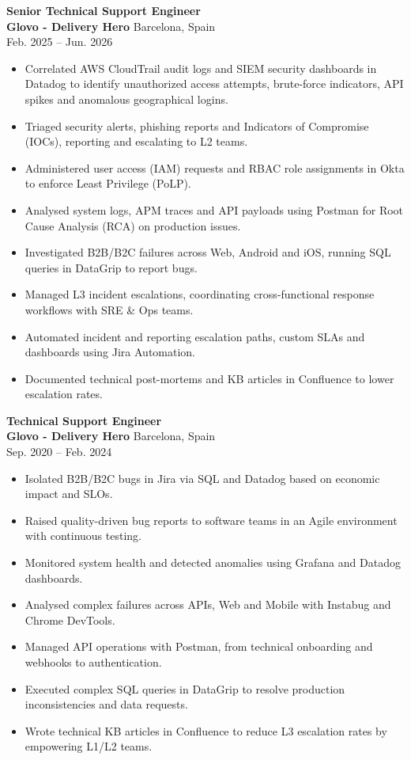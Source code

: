 \documentclass[10pt,a4paper]{article}
\begin{document}
\textbf{Senior Technical Support Engineer}\\
\textbf{Glovo - Delivery Hero} \hfill Barcelona, Spain\\
Feb. 2025 -- Jun. 2026

\begin{itemize}
\item Correlated AWS CloudTrail audit logs and SIEM security dashboards in Datadog to identify unauthorized access attempts, brute-force indicators, API spikes and anomalous geographical logins.
\item Triaged security alerts, phishing reports and Indicators of Compromise (IOCs), reporting and escalating to L2 teams.
\item Administered user access (IAM) requests and RBAC role assignments in Okta to enforce Least Privilege (PoLP).
\item Analysed system logs, APM traces and API payloads using Postman for Root Cause Analysis (RCA) on production issues.
\item Investigated B2B/B2C failures across Web, Android and iOS, running SQL queries in DataGrip to report bugs.
\item Managed L3 incident escalations, coordinating cross-functional response workflows with SRE \& Ops teams.
\item Automated incident and reporting escalation paths, custom SLAs and dashboards using Jira Automation.
\item Documented technical post-mortems and KB articles in Confluence to lower escalation rates.
\end{itemize}

\textbf{Technical Support Engineer}\\
\textbf{Glovo - Delivery Hero} \hfill Barcelona, Spain\\
Sep. 2020 -- Feb. 2024

\begin{itemize}
\item Isolated B2B/B2C bugs in Jira via SQL and Datadog based on economic impact and SLOs.
\item Raised quality-driven bug reports to software teams in an Agile environment with continuous testing.
\item Monitored system health and detected anomalies using Grafana and Datadog dashboards.
\item Analysed complex failures across APIs, Web and Mobile with Instabug and Chrome DevTools.
\item Managed API operations with Postman, from technical onboarding and webhooks to authentication.
\item Executed complex SQL queries in DataGrip to resolve production inconsistencies and data requests.
\item Wrote technical KB articles in Confluence to reduce L3 escalation rates by empowering L1/L2 teams.
\end{itemize}
\end{document}
